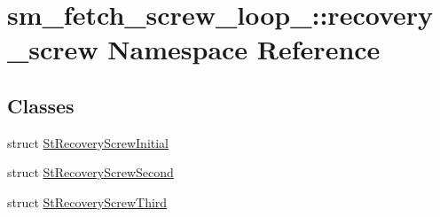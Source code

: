 \hypertarget{namespacesm__fetch__screw__loop__1_1_1recovery__screw}{}\section{sm\+\_\+fetch\+\_\+screw\+\_\+loop\+\_\+:\+:recovery\+\_\+screw Namespace Reference}
\label{namespacesm__fetch__screw__loop__1_1_1recovery__screw}
\subsection*{Classes}
\begin{DoxyCompactItemize}
\item 
struct \hyperlink{structsm__fetch__screw__loop__1_1_1recovery__screw_1_1StRecoveryScrewInitial}{St\+Recovery\+Screw\+Initial}
\item 
struct \hyperlink{structsm__fetch__screw__loop__1_1_1recovery__screw_1_1StRecoveryScrewSecond}{St\+Recovery\+Screw\+Second}
\item 
struct \hyperlink{structsm__fetch__screw__loop__1_1_1recovery__screw_1_1StRecoveryScrewThird}{St\+Recovery\+Screw\+Third}
\end{DoxyCompactItemize}
